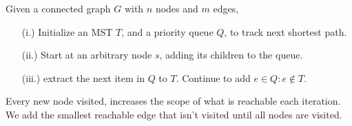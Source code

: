 \vspace{-1em}
\begin{theo}

    Given a connected graph $G$ with $n$ nodes and $m$ edges,
    \begin{enumerate}
        \item [(i.)] Initialize an MST $T$, and a priority queue $Q$, to track next shortest path.
        \item [(ii.)] Start at an arbitrary node $s$, adding its children to the queue.
        \item [(iii.)] extract the next item in $Q$ to $T$. Continue to add $e\in Q:e\notin T$. 
    \end{enumerate}
    \noindent
    Every new node visited, increases the scope of what is reachable each iteration. We add the smallest reachable edge that isn't visited until all nodes are visited.
\end{theo}

